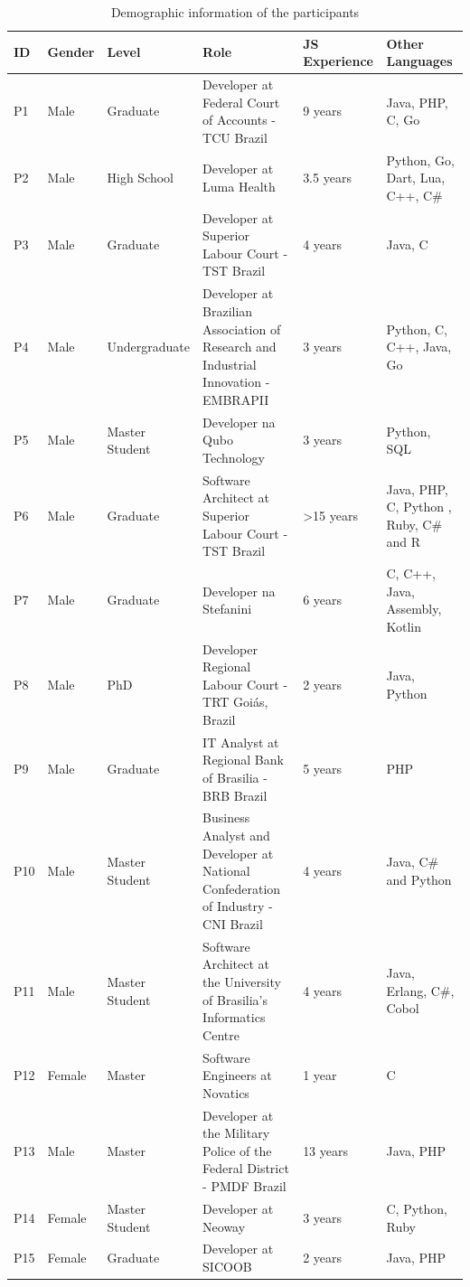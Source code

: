 \begin{table}[htb!]
\centering
\begin{tabular}
{|p{0.4cm}|p{0.9cm}|p{2.0cm}|p{7.0cm}|p{1.9cm}|p{3.0cm}|}
\hline
ID & Gender & Level & Role & JS Experience & Other Languages \\ \hline  
P1 & Male & Graduate & Developer at Federal Court of Accounts - TCU Brazil & 9 years & Java, PHP, C, Go  
\\ \hline
P2 & Male & High School & Developer at Luma Health & 3.5 years & Python, Go, Dart, Lua, C++, C\#
\\ \hline
P3 & Male & Graduate & Developer at Superior Labour Court - TST Brazil & 4 years & Java, C
\\ \hline
P4 & Male & Undergraduate & Developer at Brazilian Association of Research and Industrial Innovation - EMBRAPII & 3 years & Python, C, C++, Java, Go
\\ \hline
P5 & Male & Master Student & Developer na Qubo Technology & 3 years & Python, SQL
\\ \hline
P6 & Male & Graduate & Software Architect at Superior Labour Court - TST Brazil & >15 years & Java, PHP, C, Python , Ruby, C\# and R
\\ \hline
P7 & Male & Graduate & Developer na Stefanini & 6 years & C, C++, Java, Assembly, Kotlin
\\ \hline
P8 & Male & PhD & Developer Regional Labour Court - TRT Goiás, Brazil & 2 years & Java, Python
\\ \hline
P9 & Male & Graduate & IT Analyst at Regional Bank of Brasilia - BRB Brazil & 5 years & PHP
\\ \hline
P10 & Male & Master Student & Business Analyst and Developer at National Confederation of Industry - CNI Brazil & 4 years & Java, C\# and Python
\\ \hline
P11 & Male & Master Student & Software Architect at the University of Brasilia's Informatics Centre & 4 years & Java, Erlang, C\#, Cobol
\\ \hline
P12 & Female & Master & Software Engineers at Novatics & 1 year & C
\\ \hline
P13 & Male & Master & Developer at the Military Police of the Federal District - PMDF Brazil & 13 years & Java, PHP
\\ \hline
P14 & Female & Master Student & Developer at Neoway & 3 years & C, Python, Ruby
\\ \hline
P15 & Female &  Graduate & Developer at SICOOB & 2 years & Java, PHP
\\ \hline
\end{tabular}
    \caption{Demographic information of the participants}
    \label{pinterview}
\end{table}

